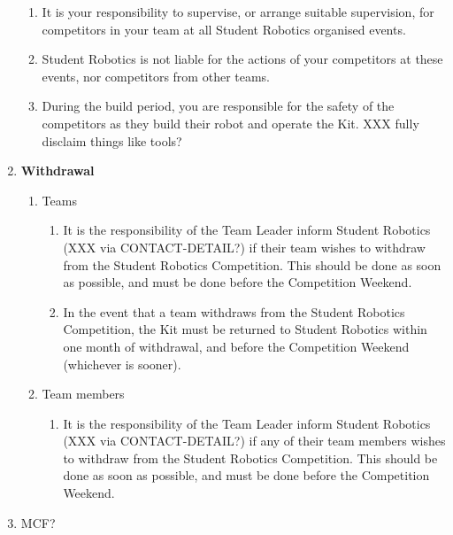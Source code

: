 \documentclass[a4paper, 11pt]{scrartcl}
\begin{document}
\begin{enumerate}
\begin{enumerate}
\item It is your responsibility to supervise, or arrange suitable supervision,
for competitors in your team at all Student Robotics organised events.

\item Student Robotics is not liable for the actions of your competitors at
these events, nor competitors from other teams.

\item During the build period, you are responsible for the safety of the
competitors as they build their robot and operate the Kit. XXX fully disclaim
things like tools?

\end{enumerate}

\item \textbf{Withdrawal}
\begin{enumerate}

\item Teams
\begin{enumerate}
\item It is the responsibility of the Team Leader inform
Student Robotics (XXX via CONTACT-DETAIL?) if their team wishes to withdraw
from the Student Robotics Competition. This should be done as soon as possible,
and must be done before the Competition Weekend.

\item In the event that a team withdraws from the Student Robotics Competition,
the Kit must be returned to Student Robotics within one month of withdrawal,
and before the Competition Weekend (whichever is sooner).
\end{enumerate}

\item Team members
\begin{enumerate}
\item It is the responsibility of the Team Leader inform Student Robotics
(XXX via CONTACT-DETAIL?) if any of their team members wishes to withdraw
from the Student Robotics Competition. This should be done as soon as possible,
and must be done before the Competition Weekend.
\end{enumerate}

\end{enumerate}

\item MCF?

\end{enumerate}

\appendix
\end{document}
